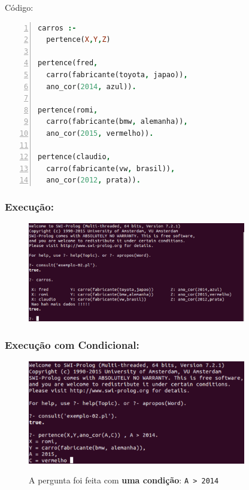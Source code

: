 \documentclass[sans]{beamer}
\begin{document}
\begin{frame}[fragile]
\begin{block}{Código:}

\begin{lstlisting}[language=Prolog, 
                   basicstyle=\footnotesize\ttfamily,
                  backgroundcolor=\color{azulclaro}, 
                  keywordstyle=\color{red},   
                  keepspaces=true,    
                  keywordstyle=\color{magenta},
     numberstyle=\tiny\color{magenta},
     commentstyle=\color{green},             
    numbers=left,                    
    numbersep=5pt]
carros :- 
  pertence(X,Y,Z)

pertence(fred, 
  carro(fabricante(toyota, japao)), 
  ano_cor(2014, azul)).
  
pertence(romi, 
  carro(fabricante(bmw, alemanha)), 
  ano_cor(2015, vermelho)).
  
pertence(claudio, 
  carro(fabricante(vw, brasil)), 
  ano_cor(2012, prata)).
\end{lstlisting}
\end{block}
\end{frame}

\begin{frame}
\frametitle{Execução:}

\begin{figure}[!htb]
\centering
\includegraphics[width=0.85\textwidth , height=0.65\textheight]{figuras/carros1.pdf}
\label{fig_carros1}
\end{figure}
   
\end{frame}

\begin{frame}
\frametitle{Execução com Condicional:}

\begin{figure}[!htb]
\centering
\includegraphics[width=0.85\textwidth , height=0.5\textheight]{figuras/carros2.pdf}
\label{fig_carros2}
\caption{A pergunta foi feita com \textbf{uma condição}: \texttt{A > 2014}}
\end{figure}
 
\end{frame}
\end{document}
